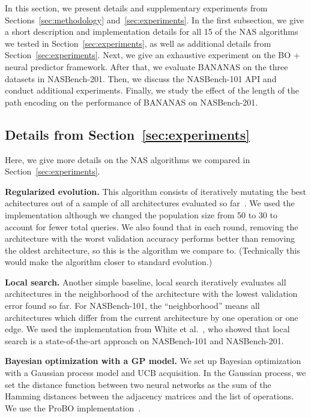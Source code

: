 \documentclass[11pt]{article}
\numberwithin{equation}{section}
\numberwithin{figure}{section}
\theoremstyle{plain}
\theoremstyle{definition}
\let\citet\cite
\begin{document}
In this section, we present details and supplementary experiments from 
Sections~\ref{sec:methodology} and~\ref{sec:experiments}.
In the first subsection, we give a short description and implementation
details for all 15 of the NAS algorithms we tested in Section~\ref{sec:experiments},
as well as additional details from Section~\ref{sec:experiments}.
Next, we give an exhaustive experiment on the
BO + neural predictor framework.
After that, we evaluate BANANAS
on the three datasets in NASBench-201.
Then,
we discuss the NASBench-101 API and conduct additional experiments.
Finally,
we study the effect of the length of the path encoding on the performance of BANANAS
on NASBench-201.






\subsection{Details from Section~\ref{sec:experiments}} \label{app:experiments:details}
Here, we give more details on the NAS algorithms we compared
in Section~\ref{sec:experiments}.

\textbf{Regularized evolution.} 
This algorithm consists of iteratively mutating the best achitectures
out of a sample of all architectures evaluated so 
far~\cite{real2019regularized}.
We used the~\cite{nasbench} implementation although we
changed the population size from 50 to 30 to account for fewer total queries.
We also found that in each round, removing the architecture with the worst validation
accuracy performs better than removing the oldest architecture, so this is the
algorithm we compare to. (Technically this would make the algorithm 
closer to standard evolution.)

\textbf{Local search.} 
Another simple baseline, local search iteratively evaluates all architectures
in the neighborhood of the architecture with the lowest validation error found so
far. For NASBench-101, the ``neighborhood'' means all architectures which differ
from the current architecture by one operation or one edge.
We used the implementation from White et al.~\citet{white2020local},
who showed that local search is a state-of-the-art
approach on NASBench-101 and NASBench-201.

\textbf{Bayesian optimization with a GP model.}
We set up Bayesian optimization with a Gaussian process model and UCB acquisition.
In the Gaussian process, we set the distance function between two neural networks
as the sum of the Hamming distances between the adjacency matrices and the list of operations.
We use the ProBO implementation~\cite{neiswanger2019probo}.
\end{document}
